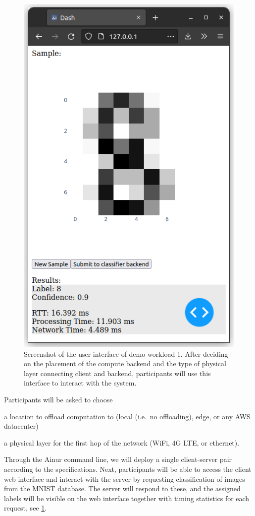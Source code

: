 \begin{figure}
    \centering
    \includegraphics[width=.65\columnwidth]{publications/2022Ainur/figures/demo_mockup.png}
    \caption{Screenshot of the user interface of demo workload 1. After deciding on the placement of the compute backend and the type of physical layer connecting client and backend, participants will use this interface to interact with the system.}\label{fig:mockup}
\end{figure}

Participants will be asked to choose
\begin{enumerate*}[itemjoin={{; }}, itemjoin*={{; and }}]
    \item a location to offload computation to (local (i.e.\ no offloading), edge, or any \gls{AWS} datacenter)
    \item a physical layer for the first hop of the network (WiFi, 4G \gls{LTE}, or ethernet).
\end{enumerate*}
Through the Ainur command line, we will deploy a single client-server pair according to the specifications.
Next, participants will be able to access the client web interface and interact with the server by requesting classification of images from the \gls{MNIST} database.
The server will respond to these, and the assigned labels will be visible on the web interface together with timing statistics for each request, see \cref{fig:mockup}.

